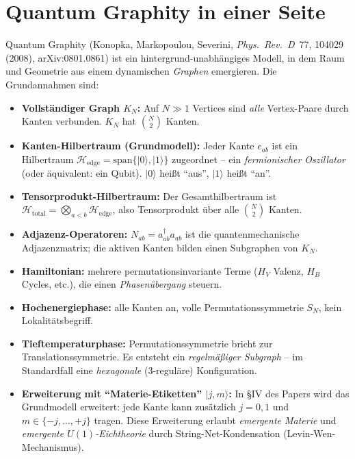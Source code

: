 \section{Quantum Graphity in einer Seite}

Quantum Graphity (Konopka, Markopoulou, Severini, \emph{Phys.~Rev.~D}~77,
104029 (2008), arXiv:0801.0861) ist ein hintergrund-unabhängiges
Modell, in dem Raum und Geometrie aus einem dynamischen \emph{Graphen}
emergieren. Die Grundannahmen sind:

\begin{itemize}[leftmargin=2em,itemsep=2pt,topsep=2pt]
  \item \textbf{Vollständiger Graph $K_N$:} Auf $N \gg 1$ Vertices
        sind \emph{alle} Vertex-Paare durch Kanten verbunden. $K_N$
        hat $\binom{N}{2}$ Kanten.
  \item \textbf{Kanten-Hilbertraum (Grundmodell):} Jeder Kante
        $e_{ab}$ ist ein Hilbertraum
        $\mathcal{H}_{\text{edge}} = \text{span}\{|0\rangle, |1\rangle\}$
        zugeordnet -- ein \emph{fermionischer Oszillator} (oder
        äquivalent: ein Qubit). $|0\rangle$ heißt \enquote{aus},
        $|1\rangle$ heißt \enquote{an}.
  \item \textbf{Tensorprodukt-Hilbertraum:} Der Gesamthilbertraum
        ist
        $\mathcal{H}_{\text{total}} = \bigotimes_{a<b} \mathcal{H}_{\text{edge}}$,
        also Tensorprodukt über alle $\binom{N}{2}$ Kanten.
  \item \textbf{Adjazenz-Operatoren:} $N_{ab} = a^\dagger_{ab} a_{ab}$
        ist die quantenmechanische Adjazenzmatrix; die aktiven Kanten
        bilden einen Subgraphen von $K_N$.
  \item \textbf{Hamiltonian:} mehrere permutationsinvariante Terme
        ($H_V$ Valenz, $H_B$ Cycles, etc.), die einen
        \emph{Phasenübergang} steuern.
  \item \textbf{Hochenergiephase:} alle Kanten an, volle
        Permutations\-symmetrie $S_N$, kein Lokalitätsbegriff.
  \item \textbf{Tieftemperaturphase:} Permutationssymmetrie bricht
        zur Translationssymmetrie. Es entsteht ein \emph{regelmäßiger
        Subgraph} -- im Standardfall eine \emph{hexagonale}
        ($3$-reguläre) Konfiguration.
  \item \textbf{Erweiterung mit \enquote{Materie-Etiketten}
        $|j, m\rangle$:} In §IV des Papers wird das Grundmodell
        erweitert: jede Kante kann zusätzlich $j = 0, 1$ und
        $m \in \{-j, \ldots, +j\}$ tragen. Diese Erweiterung erlaubt
        \emph{emergente Materie} und \emph{emergente $U(1)$-Eichtheorie}
        durch String-Net-Kondensation (Levin-Wen-Mechanismus).
\end{itemize}


